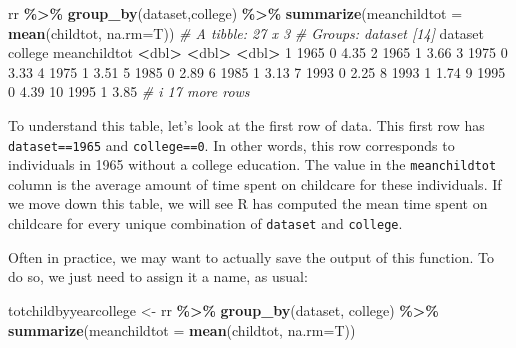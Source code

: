 \documentclass[
]{book}
\newenvironment{Shaded}{\begin{snugshade}}{\end{snugshade}}
\newcommand{\AttributeTok}[1]{\textcolor[rgb]{0.13,0.29,0.53}{#1}}
\newcommand{\CommentTok}[1]{\textcolor[rgb]{0.56,0.35,0.01}{\textit{#1}}}
\newcommand{\DecValTok}[1]{\textcolor[rgb]{0.00,0.00,0.81}{#1}}
\newcommand{\ErrorTok}[1]{\textcolor[rgb]{0.64,0.00,0.00}{\textbf{#1}}}
\newcommand{\FloatTok}[1]{\textcolor[rgb]{0.00,0.00,0.81}{#1}}
\newcommand{\FunctionTok}[1]{\textcolor[rgb]{0.13,0.29,0.53}{\textbf{#1}}}
\newcommand{\NormalTok}[1]{#1}
\newcommand{\OtherTok}[1]{\textcolor[rgb]{0.56,0.35,0.01}{#1}}
\newcommand{\SpecialCharTok}[1]{\textcolor[rgb]{0.81,0.36,0.00}{\textbf{#1}}}
\begin{document}
\begin{Shaded}
\begin{Highlighting}[]
\NormalTok{rr }\SpecialCharTok{\%\textgreater{}\%}
  \FunctionTok{group\_by}\NormalTok{(dataset,college) }\SpecialCharTok{\%\textgreater{}\%}
  \FunctionTok{summarize}\NormalTok{(}\AttributeTok{meanchildtot =} \FunctionTok{mean}\NormalTok{(childtot, }\AttributeTok{na.rm=}\NormalTok{T))}
\CommentTok{\# A tibble: 27 x 3}
\CommentTok{\# Groups:   dataset [14]}
\NormalTok{   dataset college meanchildtot}
     \SpecialCharTok{\textless{}}\NormalTok{dbl}\SpecialCharTok{\textgreater{}}   \ErrorTok{\textless{}}\NormalTok{dbl}\SpecialCharTok{\textgreater{}}        \ErrorTok{\textless{}}\NormalTok{dbl}\SpecialCharTok{\textgreater{}}
 \DecValTok{1}    \DecValTok{1965}       \DecValTok{0}         \FloatTok{4.35}
 \DecValTok{2}    \DecValTok{1965}       \DecValTok{1}         \FloatTok{3.66}
 \DecValTok{3}    \DecValTok{1975}       \DecValTok{0}         \FloatTok{3.33}
 \DecValTok{4}    \DecValTok{1975}       \DecValTok{1}         \FloatTok{3.51}
 \DecValTok{5}    \DecValTok{1985}       \DecValTok{0}         \FloatTok{2.89}
 \DecValTok{6}    \DecValTok{1985}       \DecValTok{1}         \FloatTok{3.13}
 \DecValTok{7}    \DecValTok{1993}       \DecValTok{0}         \FloatTok{2.25}
 \DecValTok{8}    \DecValTok{1993}       \DecValTok{1}         \FloatTok{1.74}
 \DecValTok{9}    \DecValTok{1995}       \DecValTok{0}         \FloatTok{4.39}
\DecValTok{10}    \DecValTok{1995}       \DecValTok{1}         \FloatTok{3.85}
\CommentTok{\# i 17 more rows}
\end{Highlighting}
\end{Shaded}

To understand this table, let's look at the first row of data. This first row has \texttt{dataset==1965} and \texttt{college==0}. In other words, this row corresponds to individuals in 1965 without a college education. The value in the \texttt{meanchildtot} column is the average amount of time spent on childcare for these individuals. If we move down this table, we will see R has computed the mean time spent on childcare for every unique combination of \texttt{dataset} and \texttt{college}.

Often in practice, we may want to actually save the output of this function. To do so, we just need to assign it a name, as usual:

\begin{Shaded}
\begin{Highlighting}[]
\NormalTok{totchildbyyearcollege }\OtherTok{\textless{}{-}}\NormalTok{ rr }\SpecialCharTok{\%\textgreater{}\%}
  \FunctionTok{group\_by}\NormalTok{(dataset, college) }\SpecialCharTok{\%\textgreater{}\%}
  \FunctionTok{summarize}\NormalTok{(}\AttributeTok{meanchildtot =} \FunctionTok{mean}\NormalTok{(childtot, }\AttributeTok{na.rm=}\NormalTok{T))}
\end{Highlighting}
\end{Shaded}
\end{document}
